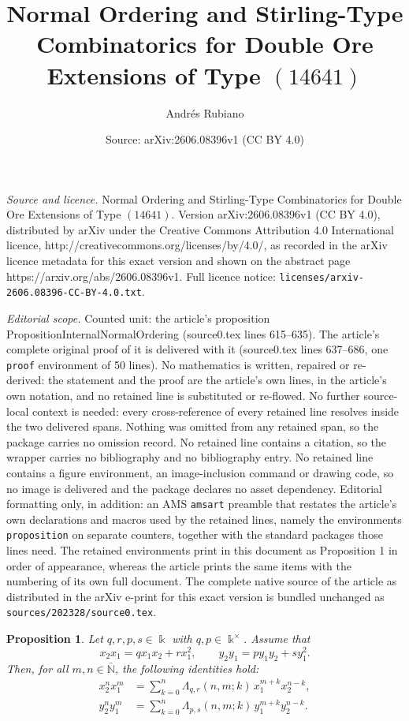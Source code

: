 \documentclass[10pt,a4paper]{amsart}
\title{Normal Ordering and Stirling-Type Combinatorics for Double Ore Extensions of Type $(14641)$}
\author{Andr\'es Rubiano}
\date{Source: arXiv:2606.08396v1 (CC BY 4.0)}
\newtheorem{proposition}{Proposition}
\begin{document}
\maketitle

\noindent\emph{Source and licence.} Normal Ordering and Stirling-Type Combinatorics for Double Ore Extensions of Type $(14641)$. Version arXiv:2606.08396v1 (CC BY 4.0), distributed by arXiv under the Creative Commons Attribution 4.0 International licence, http://creativecommons.org/licenses/by/4.0/, as recorded in the arXiv licence metadata for this exact version and shown on the abstract page https://arxiv.org/abs/2606.08396v1. Full licence notice: \texttt{licenses/arxiv-2606.08396-CC-BY-4.0.txt}.\par\smallskip

\noindent\textit{Editorial scope.} Counted unit: the article's proposition PropositionInternalNormalOrdering (source0.tex lines 615--635). The article's complete original proof of it is delivered with it (source0.tex lines 637--686, one \texttt{proof} environment of 50 lines). No mathematics is written, repaired or re-derived: the statement and the proof are the article's own lines, in the article's own notation, and no retained line is substituted or re-flowed.  No further source-local context is needed: every cross-reference of every retained line resolves inside the two delivered spans.  Nothing was omitted from any retained span, so the package carries no omission record.  No retained line contains a citation, so the wrapper carries no bibliography and no bibliography entry.  No retained line contains a figure environment, an image-inclusion command or drawing code, so no image is delivered and the package declares no asset dependency.  Editorial formatting only, in addition: an AMS \texttt{amsart} preamble that restates the article's own declarations and macros used by the retained lines, namely the environments \texttt{proposition} on separate counters, together with the standard packages those lines need.  The retained environments print in this document as Proposition 1 in order of appearance, whereas the article prints the same items with the numbering of its own full document.  The complete native source of the article as distributed in the arXiv e-print for this exact version is bundled unchanged as \texttt{sources/202328/source0.tex}.
\begin{proposition}\label{PropositionInternalNormalOrdering}
Let $q,r,p,s\in\Bbbk$ with $q,p\in\Bbbk^\times$. Assume that
\[
x_2x_1=qx_1x_2+rx_1^2,
\qquad
y_2y_1=py_1y_2+sy_1^2.
\]
Then, for all $m,n\in\bar{\mathbb{N}}$, the following identities hold:
\begin{align}
x_2^nx_1^m
&=
\sum_{k=0}^{n}
\Lambda_{q,r}(n,m;k)\,
x_1^{m+k}x_2^{n-k}, \label{EquationXInternalNormalOrdering}\\
y_2^ny_1^m
&=
\sum_{k=0}^{n}
\Lambda_{p,s}(n,m;k)\,
y_1^{m+k}y_2^{n-k}. \label{EquationYInternalNormalOrdering}
\end{align}
\end{proposition}
\end{document}
